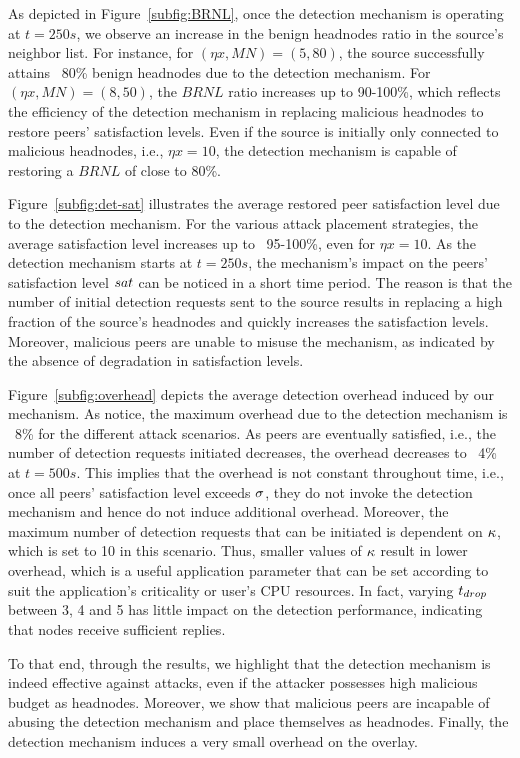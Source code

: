 As depicted in Figure~\ref{subfig:BRNL}, once the detection mechanism is operating at $t=250s$, we observe an increase in the benign headnodes ratio in the source's neighbor list.
For instance, for $(\eta x, MN)=(5, 80)$, the source successfully attains ~80\% benign headnodes due to the detection mechanism.
For $(\eta x, MN)=(8, 50)$, the $BRNL$ ratio increases up to 90-100\%, which reflects the efficiency of the detection mechanism in replacing malicious headnodes to restore peers' satisfaction levels. 
Even if the source is initially only connected to malicious headnodes, i.e., $\eta x=10$, the detection mechanism is capable of restoring a $BRNL$ of close to 80\%. 

Figure~\ref{subfig:det-sat} illustrates the average restored peer satisfaction level due to the detection mechanism.
For the various attack placement strategies, the average satisfaction level increases up to ~95-100\%, even for $\eta x=10$.
As the detection mechanism starts at $t=250s$, the mechanism's impact on the peers' satisfaction level $sat$ can be noticed in a short time period.
The reason is that the number of initial detection requests sent to the source results in replacing a high fraction of the source's headnodes and quickly increases the satisfaction levels. 
Moreover, malicious peers are unable to misuse the mechanism, as indicated by the absence of degradation in satisfaction levels. 

Figure~\ref{subfig:overhead} depicts the average detection overhead induced by our mechanism. 
As notice, the maximum overhead due to the detection mechanism is ~8\% for the different attack scenarios.
As peers are eventually satisfied, i.e., the number of detection requests initiated decreases, the overhead decreases to ~4\% at $t=500s$.
This implies that the overhead is not constant throughout time, i.e., once all peers' satisfaction level exceeds $\sigma$, they do not invoke the detection mechanism and hence do not induce additional overhead. 
Moreover, the maximum number of detection requests that can be initiated is dependent on $\kappa$, which is set to 10 in this scenario.
Thus, smaller values of $\kappa$ result in lower overhead, which is a useful application parameter that can be set according to suit the application's criticality or user's CPU resources.
In fact, varying $t_{drop}$ between 3, 4 and 5 has little impact on the detection performance, indicating that nodes receive sufficient replies.

To that end, through the results, we highlight that the detection mechanism is indeed effective against \drop attacks, even if the attacker possesses high malicious budget as headnodes.
Moreover, we show that malicious peers are incapable of abusing the detection mechanism and place themselves as headnodes. Finally, the detection mechanism induces a very small overhead on the overlay.


